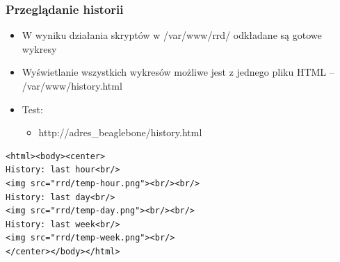 \documentclass[dvipsnames,table]{beamer}
\begin{document}
\begin{frame}[fragile]
\frametitle{Przeglądanie historii}
\begin{itemize}
	\item W wyniku działania skryptów w /var/www/rrd/ odkładane są gotowe wykresy
	\item Wyświetlanie wszystkich wykresów możliwe jest z jednego pliku HTML -- /var/www/history.html
	\item Test:
	\begin{itemize}
		\item http://adres\_beaglebone/history.html
	\end{itemize}
\end{itemize}
\scriptsize
\begin{verbatim}
<html><body><center>
History: last hour<br/>
<img src="rrd/temp-hour.png"><br/><br/>
History: last day<br/>
<img src="rrd/temp-day.png"><br/><br/>
History: last week<br/>
<img src="rrd/temp-week.png"><br/>
</center></body></html>
\end{verbatim}
\end{frame}
\end{document}
